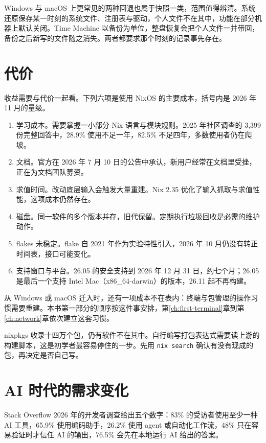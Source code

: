 Windows 与 macOS 上更常见的两种回退也属于快照一类，范围值得辨清。系统还原保存某一时刻的系统文件、注册表与驱动，个人文件不在其中，功能在部分机器上默认关闭。Time Machine 以备份为单位，整盘恢复会把个人文件一并带回，备份之后新写的文件随之消失。两者都要求那个时刻的记录事先存在。

\section{代价}

收益需要与代价一起看。下列六项是使用 NixOS 的主要成本，括号内是 2026 年 11 月的量级。

\begin{enumerate}
  \item 学习成本。需要掌握一小部分 Nix 语言与模块规则。2025 年社区调查的 3,399 份完整回答中，28.9\% 使用不足一年，82.5\% 不足四年，多数使用者仍在爬坡。
  \item 文档。官方在 2026 年 7 月 10 日的公告中承认，新用户经常在文档里受挫，正在为文档团队募资。
  \item 求值时间。改动底层输入会触发大量重建。Nix 2.35 优化了输入抓取与求值性能，这项成本仍然存在。
  \item 磁盘。同一软件的多个版本并存，旧代保留。定期执行垃圾回收是必需的维护动作。
  \item flakes 未稳定。flake 自 2021 年作为实验特性引入，2026 年 10 月仍没有转正时间表，接口可能变化。
  \item 支持窗口与平台。26.05 的安全支持到 2026 年 12 月 31 日，约七个月；26.05 是最后一个支持 Intel Mac（x86\_64-darwin）的版本，26.11 起不再构建。
\end{enumerate}

从 Windows 或 macOS 迁入时，还有一项成本不在表内：终端与包管理的操作习惯需要重建。本书第一部分的顺序按这件事安排，第\ref{ch:first-terminal}章到第\ref{ch:network}章依次建立这套习惯。

\begin{warnbox}[未收录的软件要自行打包]
nixpkgs 收录十四万个包，仍有软件不在其中。自行编写打包表达式需要读上游的构建脚本，这是初学者最容易停住的一步。先用 \texttt{nix search} 确认有没有现成的包，再决定是否自己写。
\end{warnbox}

\section{AI 时代的需求变化}

Stack Overflow 2026 年的开发者调查给出五个数字：83\% 的受访者使用至少一种 AI 工具，65.9\% 使用编码助手，26.2\% 使用 agent 或自动化工作流，48\% 只在容易验证时才信任 AI 的输出，76.5\% 会先在本地运行 AI 给出的答案。

